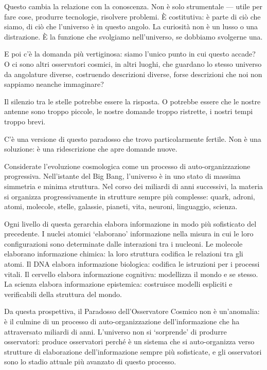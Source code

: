 \documentclass[12pt,a4paper,openany]{book}
\newcommand{\sezione}[1]{\vspace{1.2em}{\large\bfseries #1}\vspace{0.5em}\par}
\begin{document}
Questo cambia la relazione con la conoscenza. Non è solo strumentale — utile per fare cose, produrre tecnologie, risolvere problemi. È costitutiva: è parte di ciò che siamo, di ciò che l'universo è in questo angolo. La curiosità non è un lusso o una distrazione. È la funzione che svolgiamo nell'universo, se dobbiamo svolgerne una.

E poi c'è la domanda più vertiginosa: siamo l'unico punto in cui questo accade? O ci sono altri osservatori cosmici, in altri luoghi, che guardano lo stesso universo da angolature diverse, costruendo descrizioni diverse, forse descrizioni che noi non sappiamo neanche immaginare?

Il silenzio tra le stelle potrebbe essere la risposta. O potrebbe essere che le nostre antenne sono troppo piccole, le nostre domande troppo ristrette, i nostri tempi troppo brevi.

\sezione{Il cosmo che impara}

C'è una versione di questo paradosso che trovo particolarmente fertile. Non è una soluzione: è una ridescrizione che apre domande nuove.

Considerate l'evoluzione cosmologica come un processo di auto-organizzazione progressiva. Nell'istante del Big Bang, l'universo è in uno stato di massima simmetria e minima struttura. Nel corso dei miliardi di anni successivi, la materia si organizza progressivamente in strutture sempre più complesse: quark, adroni, atomi, molecole, stelle, galassie, pianeti, vita, neuroni, linguaggio, scienza.

Ogni livello di questa gerarchia elabora informazione in modo più sofisticato del precedente. I nuclei atomici `elaborano' informazione nella misura in cui le loro configurazioni sono determinate dalle interazioni tra i nucleoni. Le molecole elaborano informazione chimica: la loro struttura codifica le relazioni tra gli atomi. Il DNA elabora informazione biologica: codifica le istruzioni per i processi vitali. Il cervello elabora informazione cognitiva: modellizza il mondo e se stesso. La scienza elabora informazione epistemica: costruisce modelli espliciti e verificabili della struttura del mondo.

Da questa prospettiva, il Paradosso dell'Osservatore Cosmico non è un'anomalia: è il culmine di un processo di auto-organizzazione dell'informazione che ha attraversato miliardi di anni. L'universo non si `sorprende' di produrre osservatori: produce osservatori perché è un sistema che si auto-organizza verso strutture di elaborazione dell'informazione sempre più sofisticate, e gli osservatori sono lo stadio attuale più avanzato di questo processo.
\end{document}
